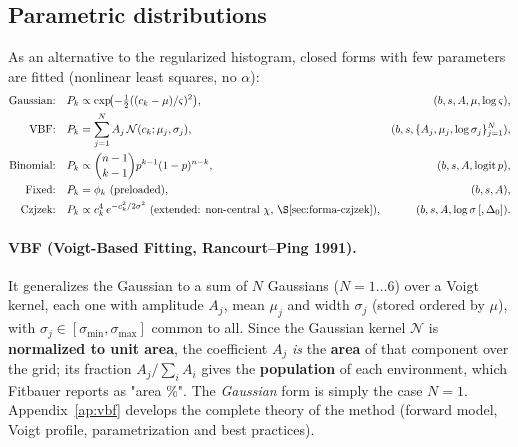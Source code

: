 \subsection{Parametric distributions}
As an alternative to the regularized histogram, closed forms with few parameters are
fitted (nonlinear least squares, no $\alpha$):
\begin{align}
  \text{Gaussian:}\quad & P_k\propto \exp\!\bigl(-\tfrac12((c_k-\mu)/\varsigma)^2\bigr), & (b,s,A,\mu,\log\varsigma),\\
  \text{VBF:}\quad & P_k = \sum_{j=1}^{N} A_j\,\mathcal N(c_k;\mu_j,\sigma_j), & (b,s,\{A_j,\mu_j,\log\sigma_j\}_{j=1}^N),\\
  \text{Binomial:}\quad & P_k\propto \binom{n-1}{k-1}p^{k-1}(1-p)^{n-k}, & (b,s,A,\mathrm{logit}\,p),\\
  \text{Fixed:}\quad & P_k=\phi_k\ \text{(preloaded)}, & (b,s,A),\\
  \text{Czjzek:}\quad & P_k\propto c_k^{4}\,e^{-c_k^2/2\sigma^2}\ \text{(extended: non-central $\chi$, \S\ref{sec:forma-czjzek})}, & (b,s,A,\log\sigma\,[,\Delta_0]).
\end{align}

\paragraph{VBF (Voigt-Based Fitting, Rancourt--Ping 1991).} It generalizes the
Gaussian to a sum of $N$ Gaussians ($N=1\ldots6$) over a Voigt kernel, each one
with amplitude $A_j$, mean $\mu_j$ and width $\sigma_j$ (stored ordered by $\mu$),
with $\sigma_j\in[\sigma_{\min},\sigma_{\max}]$ common to all.
Since the Gaussian kernel $\mathcal N$ is \textbf{normalized to unit area}, the
coefficient $A_j$ \emph{is} the \textbf{area} of that component over the grid; its
fraction $A_j/\sum_i A_i$ gives the \textbf{population} of each environment, which
Fitbauer reports as "area \%". The \emph{Gaussian} form is simply the case $N=1$.
Appendix~\ref{ap:vbf} develops the complete theory of the method (forward model,
Voigt profile, parametrization and best practices).

